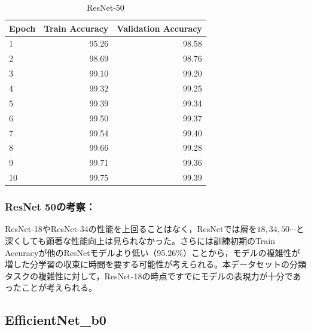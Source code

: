 \documentclass[a4paper,11pt,titlepage]{jsarticle}
\begin{document}
\begin{table}[H]
\centering
\caption{ResNet-50}
\label{tab:ResNet50}
\begin{tabular}{lrr}
\hline
 Epoch &  Train Accuracy &  Validation Accuracy \\
\hline
     1 &           95.26 &                98.58 \\
     2 &           98.69 &                98.76 \\
     3 &           99.10 &                99.20 \\
     4 &           99.32 &                99.25 \\
     5 &           99.39 &                99.34 \\
     6 &           99.50 &                99.37 \\
     7 &           99.54 &                99.40 \\
     8 &           99.66 &                99.28 \\
     9 &           99.71 &                99.36 \\
    10 &           99.75 &                99.39 \\
\hline
\end{tabular}
\end{table}

\subsubsection*{ResNet 50の考察：}
ResNet-18やResNet-34の性能を上回ることはなく，ResNetでは層を$18,34,50 \cdots$と深くしても顕著な性能向上は見られなかった。さらには訓練初期のTrain Accuracyが他のResNetモデルより低い（95.26\%）ことから，モデルの複雑性が増した分学習の収束に時間を要する可能性が考えられる。本データセットの分類タスクの複雑性に対して，ResNet-18の時点ですでにモデルの表現力が十分であったことが考えられる。


\subsection{EfficientNet\_b0}
\end{document}
